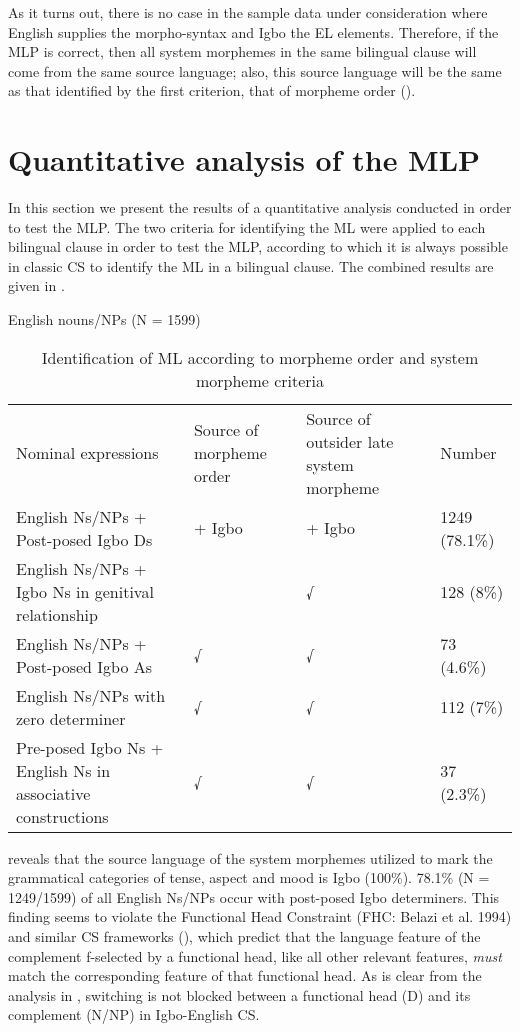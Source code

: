 \documentclass[output=paper]{langsci/langscibook}
\begin{document}
As it turns out, there is no case in the sample data under consideration where English supplies the morpho-syntax and Igbo the EL elements. Therefore, if the MLP is correct, then all system morphemes in the same bilingual clause will come from the same source language; also, this source language will be the same as that identified by the first criterion, that of morpheme order ().

\section{Quantitative analysis of the MLP}

In this section we present the results of a quantitative analysis conducted in order to test the MLP. The two criteria for identifying the ML were applied to each bilingual clause in order to test the MLP, according to which it is always possible in classic CS to identify the ML in a bilingual clause. The combined results are given in . 
 
\begin{table}
English nouns/NPs (N = 1599)

\begin{tabularx}{\textwidth}{XXXX}
Nominal expressions                                             & Source of morpheme order & Source of outsider late system morpheme & Number \\
English Ns/NPs + Post-posed Igbo Ds                             & + Igbo   &   + Igbo & 1249 (78.1\%) \\
English Ns/NPs + Igbo Ns in genitival relationship             &          &    √       & 128 (8\%)     \\
English Ns/NPs + Post-posed Igbo As                            &  √      &     √      &  73 (4.6\%)   \\
English Ns/NPs with zero determiner                            &  √     &      √      &  112 (7\%)   \\
Pre-posed Igbo Ns + English Ns in associative constructions   &   √    &       √      & 37 (2.3\%)   \\
\end{tabularx}
     
\caption{Identification of ML according to morpheme order and system morpheme criteria}
\label{tab:2}
\end{table} 

 reveals that the source language of the system morphemes utilized to mark the grammatical categories of tense, aspect and mood is Igbo (100\%). 78.1\% (N = 1249/1599) of all English Ns/NPs occur with post-posed Igbo determiners. This finding seems to violate the Functional Head Constraint (FHC: Belazi et al. 1994) and similar CS frameworks (), which predict that the language feature of the complement f-selected by a functional head, like all other relevant features, \textit{must} match the corresponding feature of that functional head. As is clear from the analysis in , switching is not blocked between a functional head (D) and its complement (N/NP) in Igbo-English CS. 
\end{document}
